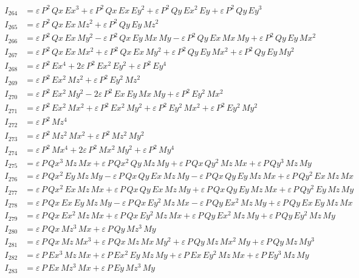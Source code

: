 \documentclass{article}
\begin{document}
\begin{align*}
I_{264} &= ε\,P^{2}\,Qx\,Ex^{3} + ε\,P^{2}\,Qx\,Ex\,Ey^{2} + ε\,P^{2}\,Qy\,Ex^{2}\,Ey + ε\,P^{2}\,Qy\,Ey^{3} \\
I_{265} &= ε\,P^{2}\,Qx\,Ex\,Mz^{2} + ε\,P^{2}\,Qy\,Ey\,Mz^{2} \\
I_{266} &= ε\,P^{2}\,Qx\,Ex\,My^{2} -ε\,P^{2}\,Qx\,Ey\,Mx\,My -ε\,P^{2}\,Qy\,Ex\,Mx\,My + ε\,P^{2}\,Qy\,Ey\,Mx^{2} \\
I_{267} &= ε\,P^{2}\,Qx\,Ex\,Mx^{2} + ε\,P^{2}\,Qx\,Ex\,My^{2} + ε\,P^{2}\,Qy\,Ey\,Mx^{2} + ε\,P^{2}\,Qy\,Ey\,My^{2} \\
I_{268} &= ε\,P^{2}\,Ex^{4} + 2ε\,P^{2}\,Ex^{2}\,Ey^{2} + ε\,P^{2}\,Ey^{4} \\
I_{269} &= ε\,P^{2}\,Ex^{2}\,Mz^{2} + ε\,P^{2}\,Ey^{2}\,Mz^{2} \\
I_{270} &= ε\,P^{2}\,Ex^{2}\,My^{2} - 2ε\,P^{2}\,Ex\,Ey\,Mx\,My + ε\,P^{2}\,Ey^{2}\,Mx^{2} \\
I_{271} &= ε\,P^{2}\,Ex^{2}\,Mx^{2} + ε\,P^{2}\,Ex^{2}\,My^{2} + ε\,P^{2}\,Ey^{2}\,Mx^{2} + ε\,P^{2}\,Ey^{2}\,My^{2} \\
I_{272} &= ε\,P^{2}\,Mz^{4} \\
I_{273} &= ε\,P^{2}\,Mz^{2}\,Mx^{2} + ε\,P^{2}\,Mz^{2}\,My^{2} \\
I_{274} &= ε\,P^{2}\,Mx^{4} + 2ε\,P^{2}\,Mx^{2}\,My^{2} + ε\,P^{2}\,My^{4} \\
I_{275} &= ε\,P\,Qx^{3}\,Mz\,Mx + ε\,P\,Qx^{2}\,Qy\,Mz\,My + ε\,P\,Qx\,Qy^{2}\,Mz\,Mx + ε\,P\,Qy^{3}\,Mz\,My \\
I_{276} &= ε\,P\,Qx^{2}\,Ey\,Mz\,My -ε\,P\,Qx\,Qy\,Ex\,Mz\,My -ε\,P\,Qx\,Qy\,Ey\,Mz\,Mx + ε\,P\,Qy^{2}\,Ex\,Mz\,Mx \\
I_{277} &= ε\,P\,Qx^{2}\,Ex\,Mz\,Mx + ε\,P\,Qx\,Qy\,Ex\,Mz\,My + ε\,P\,Qx\,Qy\,Ey\,Mz\,Mx + ε\,P\,Qy^{2}\,Ey\,Mz\,My \\
I_{278} &= ε\,P\,Qx\,Ex\,Ey\,Mz\,My -ε\,P\,Qx\,Ey^{2}\,Mz\,Mx -ε\,P\,Qy\,Ex^{2}\,Mz\,My + ε\,P\,Qy\,Ex\,Ey\,Mz\,Mx \\
I_{279} &= ε\,P\,Qx\,Ex^{2}\,Mz\,Mx + ε\,P\,Qx\,Ey^{2}\,Mz\,Mx + ε\,P\,Qy\,Ex^{2}\,Mz\,My + ε\,P\,Qy\,Ey^{2}\,Mz\,My \\
I_{280} &= ε\,P\,Qx\,Mz^{3}\,Mx + ε\,P\,Qy\,Mz^{3}\,My \\
I_{281} &= ε\,P\,Qx\,Mz\,Mx^{3} + ε\,P\,Qx\,Mz\,Mx\,My^{2} + ε\,P\,Qy\,Mz\,Mx^{2}\,My + ε\,P\,Qy\,Mz\,My^{3} \\
I_{282} &= ε\,P\,Ex^{3}\,Mz\,Mx + ε\,P\,Ex^{2}\,Ey\,Mz\,My + ε\,P\,Ex\,Ey^{2}\,Mz\,Mx + ε\,P\,Ey^{3}\,Mz\,My \\
I_{283} &= ε\,P\,Ex\,Mz^{3}\,Mx + ε\,P\,Ey\,Mz^{3}\,My \\

\end{align*}
\end{document}
